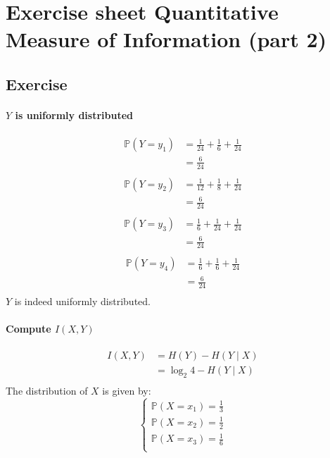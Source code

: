 \documentclass{article}
\newcommand{\1}{\mathbf{1}}
\renewcommand{\P}{\mathbb{P}}
\begin{document}
\section{Exercise sheet Quantitative Measure of Information (part 2)}
\subsection{Exercise}
\paragraph{$Y$ is uniformly distributed}
\begin{align*}
  \P(Y = y_1)
   & = \frac{1}{24} + \frac{1}{6} + \frac{1}{24} \\
   & = \frac{6}{24}                              \\
\end{align*}
\begin{align*}
  \P(Y = y_2)
   & = \frac{1}{12} + \frac{1}{8} + \frac{1}{24} \\
   & = \frac{6}{24}                              \\
\end{align*}
\begin{align*}
  \P(Y = y_3)
   & = \frac{1}{6} + \frac{1}{24} + \frac{1}{24} \\
   & = \frac{6}{24}                              \\
\end{align*}
\begin{align*}
  \P(Y = y_4)
   & = \frac{1}{6} + \frac{1}{6} + \frac{1}{24} \\
   & = \frac{6}{24}                             \\
\end{align*}
$Y$ is indeed uniformly distributed.

\paragraph{Compute $I(X, Y)$}
\begin{align*}
  I(X, Y)
   & = H(Y) - H(Y \mid X)     \\
   & = \log_2 4 - H(Y \mid X) \\
\end{align*}
The distribution of $X$ is given by:
$$
  \begin{cases}
    \P(X = x_1) = \frac{1}{3} \\
    \P(X = x_2) = \frac{1}{2} \\
    \P(X = x_3) = \frac{1}{6} \\
  \end{cases}
$$
\end{document}
